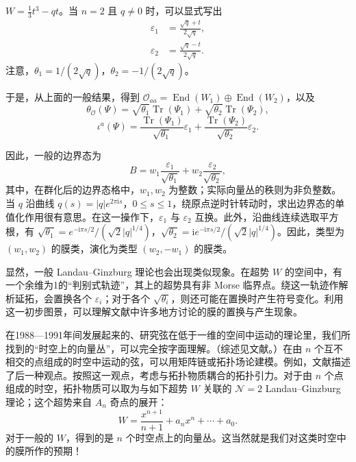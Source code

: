 \begin{example}\label{ex:2.10}
$W=\frac13t^3-qt$。当 $n=2$ 且 $q\ne0$ 时，可以显式写出
\begin{equation}\label{eq:2.62}
\begin{aligned}
\varepsilon_1&=\frac{\sqrt{q}+t}{2\sqrt{q}},\\
\varepsilon_2&=\frac{\sqrt{q}-t}{2\sqrt{q}}.
\end{aligned}
\end{equation}
注意，$\theta_1=1/(2\sqrt{q})$，$\theta_2=-1/(2\sqrt{q})$。

于是，从上面的一般结果，得到 $\mathcal{O}_{aa}=\operatorname{End}(W_1)\oplus\operatorname{End}(W_2)$，以及
\begin{equation}\label{eq:2.63}
\theta_{\mathcal{O}}(\Psi)=\sqrt{\theta_1}\operatorname{Tr}(\Psi_1)+\sqrt{\theta_2}\operatorname{Tr}(\Psi_2),
\end{equation}
\begin{equation}\label{eq:2.64}
\iota^a(\Psi)=\frac{\operatorname{Tr}(\Psi_1)}{\sqrt{\theta_1}}\varepsilon_1
+\frac{\operatorname{Tr}(\Psi_2)}{\sqrt{\theta_2}}\varepsilon_2.
\end{equation}

因此，一般的边界态为
\begin{equation}\label{eq:2.65}
B=w_1\frac{\varepsilon_1}{\sqrt{\theta_1}}+w_2\frac{\varepsilon_2}{\sqrt{\theta_2}},
\end{equation}
其中，在群化后的边界态格中，$w_1,w_2$ 为整数；实际向量丛的秩则为非负整数。当 $q$ 沿曲线 $q(s)=|q|e^{2\pi\mathrm{i}s}$，$0\le s\le1$，绕原点逆时针转动时，求出边界态的单值化作用很有意思。在这一操作下，$\varepsilon_1$ 与 $\varepsilon_2$ 互换。此外，沿曲线连续选取平方根，有 $\sqrt{\theta_1}=e^{-\mathrm{i}\pi s/2}/(\sqrt{2}|q|^{1/4})$，$\sqrt{\theta_2}=\mathrm{i}e^{-\mathrm{i}\pi s/2}/(\sqrt{2}|q|^{1/4})$。因此，类型为 $(w_1,w_2)$ 的膜类，演化为类型 $(w_2,-w_1)$ 的膜类。
\end{example}

显然，一般 Landau--Ginzburg 理论也会出现类似现象。在超势 $W$ 的空间中，有一个余维为1的“判别式轨迹”，其上的超势具有非 Morse 临界点。绕这一轨迹作解析延拓，会置换各个 $\varepsilon_i$；对于各个 $\sqrt{\theta_i}$，则还可能在置换时产生符号变化。利用这一初步图景，可以理解文献中许多地方讨论的膜的置换与产生现象。

在1988—1991年间发展起来的、研究弦在低于一维的空间中运动的理论里，我们所找到的“时空上的向量丛”，可以完全按字面理解。（综述见文献。）在由 $n$ 个互不相交的点组成的时空中运动的弦，可以用矩阵链或拓扑场论建模。例如，文献描述了后一种观点。按照这一观点，考虑与拓扑物质耦合的拓扑引力。对于由 $n$ 个点组成的时空，拓扑物质可以取为与如下超势 $W$ 关联的 $\mathcal{N}=2$ Landau--Ginzburg 理论；这个超势来自 $A_n$ 奇点的展开：
\begin{equation}\label{eq:2.66}
W=\frac{x^{n+1}}{n+1}+a_nx^n+\cdots+a_0.
\end{equation}
对于一般的 $W$，得到的是 $n$ 个时空点上的向量丛。这当然就是我们对这类时空中的膜所作的预期！

